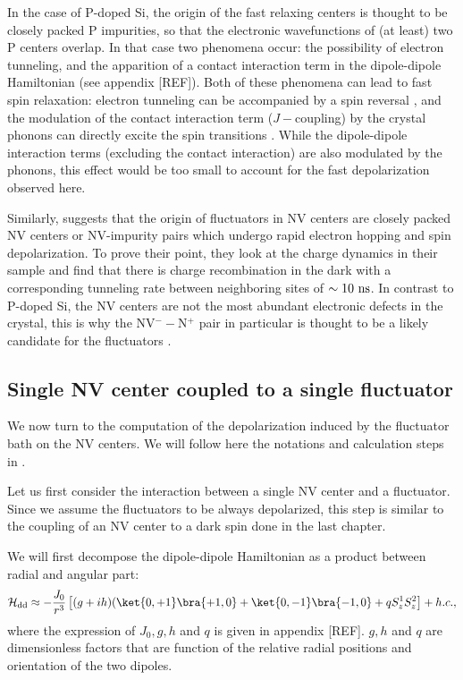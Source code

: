 \documentclass[a4paper, 11pt]{book}
\begin{document}
In the case of P-doped Si, the origin of the fast relaxing centers is thought to be closely packed P impurities, so that the electronic wavefunctions of (at least) two P centers overlap. In that case two phenomena occur: the possibility of electron tunneling, and the apparition of a contact interaction term in the dipole-dipole Hamiltonian (see appendix [REF]). Both of these phenomena can lead to fast spin relaxation: electron tunneling can be accompanied by a spin reversal \citep{sugihara1963spin}, and the modulation of the contact interaction term ($J-$coupling) by the crystal phonons can directly excite the spin transitions \citep{honig1960electron}. While the dipole-dipole interaction terms (excluding the contact interaction) are also modulated by the phonons, this effect would be too small to account for the fast depolarization observed here.

Similarly, \citep{choi2017depolarization} suggests that the origin of fluctuators in NV centers are closely packed NV centers or NV-impurity pairs which undergo rapid electron hopping and spin depolarization. To prove their point, they look at the charge dynamics in their sample and find that there is charge recombination in the dark with a corresponding tunneling rate between neighboring sites of $\sim 10\ \rm ns$. In contrast to P-doped Si, the NV centers are not the most abundant electronic defects in the crystal, this is why the NV$^--$N$^+$ pair in particular is thought to be a likely candidate for the fluctuators \citep{manson2018nv}.

\subsection{Single NV center coupled to a single fluctuator}
We now turn to the computation of the depolarization induced by the fluctuator bath on the NV centers. We will follow here the notations and calculation steps in \citep{choi2017depolarization}. 

Let us first consider the interaction between a single NV center and a fluctuator. Since we assume the fluctuators to be always depolarized, this step is similar to the coupling of an NV center to a dark spin done in the last chapter.

We will first decompose the dipole-dipole Hamiltonian as a product between radial and angular part:
\begin{equation}
\mathcal{H}_{\rm dd} \approx - \frac{J_0}{r^3} \left[(g+ih)(\ket{0,+1}\bra{+1,0}+\ket{0,-1}\bra{-1,0}+qS_z^1 S_z^2 \right] + h.c. ,
\end{equation}
where the expression of $J_0, g, h$ and $q$ is given in appendix [REF]. $g, h$ and $q$ are dimensionless factors that are function of the relative radial positions and orientation of the two dipoles.
\end{document}
